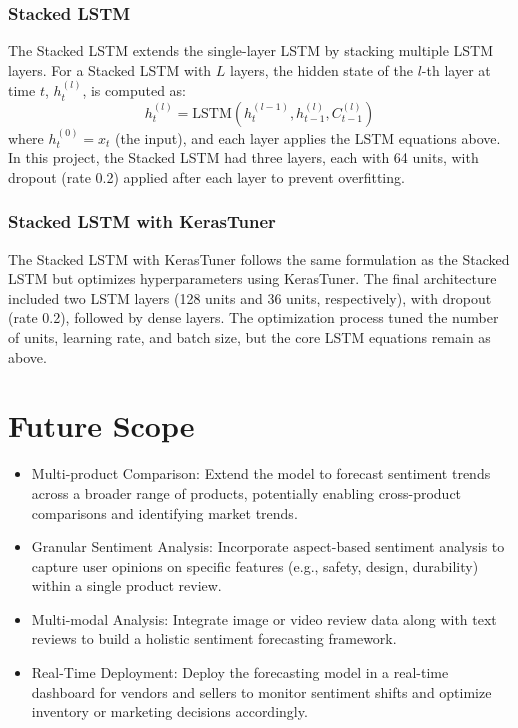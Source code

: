 \documentclass[letterpaper]{article}
\begin{document}
\subsubsection{Stacked LSTM}
The Stacked LSTM extends the single-layer LSTM by stacking multiple LSTM layers. For a Stacked LSTM with $L$ layers, the hidden state of the $l$-th layer at time $t$, $h_t^{(l)}$, is computed as:
\[
h_t^{(l)} = \text{LSTM}(h_t^{(l-1)}, h_{t-1}^{(l)}, C_{t-1}^{(l)})
\]
where $h_t^{(0)} = x_t$ (the input), and each layer applies the LSTM equations above. In this project, the Stacked LSTM had three layers, each with 64 units, with dropout (rate 0.2) applied after each layer to prevent overfitting.

\subsubsection{Stacked LSTM with KerasTuner}
The Stacked LSTM with KerasTuner follows the same formulation as the Stacked LSTM but optimizes hyperparameters using KerasTuner. The final architecture included two LSTM layers (128 units and 36 units, respectively), with dropout (rate 0.2), followed by dense layers. The optimization process tuned the number of units, learning rate, and batch size, but the core LSTM equations remain as above.


\section{Future Scope}
\begin{itemize}
    \item Multi-product Comparison: Extend the model to forecast sentiment trends across a broader range of products, potentially enabling cross-product comparisons and identifying market trends.
    \item Granular Sentiment Analysis: Incorporate aspect-based sentiment analysis to capture user opinions on specific features (e.g., safety, design, durability) within a single product review.
    \item Multi-modal Analysis: Integrate image or video review data along with text reviews to build a holistic sentiment forecasting framework.
    \item Real-Time Deployment: Deploy the forecasting model in a real-time dashboard for vendors and sellers to monitor sentiment shifts and optimize inventory or marketing decisions accordingly.
\end{itemize}
\end{document}

